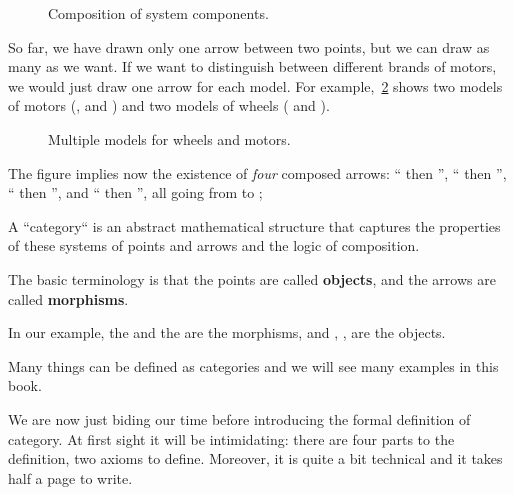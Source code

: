 \begin{figure}[h!]
  \centering
  \caption{Composition of system components. }
  \label{fig:e4}
\end{figure}

So far, we have drawn only one arrow between two points, but we can draw as many as we want.
If we want to distinguish between different brands of motors, we would just draw
one arrow for each model. For example,~\cref{fig:e4bis} shows two models of
motors (, and ) and two models of wheels
( and ).


\begin{figure}[h!]
  \centering
  \caption{Multiple models for wheels and motors.}
   \label{fig:e4bis}
\end{figure}

The figure implies now the existence of \emph{four} composed
arrows: `` then '',
`` then '',
`` then '', and
`` then '', all going from \translationalmotion to \electricpower;


A ``category`` is an abstract mathematical structure that captures the properties
of these systems of points and arrows and the logic of composition.

The basic terminology is that the points are called \textbf{objects},
and the arrows are called \textbf{morphisms}.

In our example, the \motor and the \wheels are the morphisms, and \electricpower, \rotationalmotion,
\translationalmotion are the objects.

Many things can be defined as categories and we will see many examples in this book.

We are now just biding our time before introducing the formal definition of category.
At first sight it will be intimidating: there are four parts to the definition, two axioms to define.
Moreover, it is quite a bit technical and it takes half a page to write.

